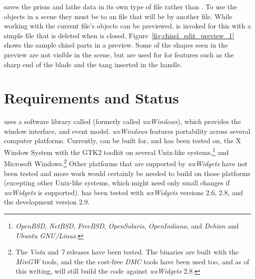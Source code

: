 \IXpkgu{} saves the prism and lathe data in its own type
of file rather than \IXpov{} .
To use the objects in a \IXpov{} scene they
must be  to an  file that will be
 by another  file. While
working with \IXpkg{} the current file's objects can
be previewed. \IXpov{} is invoked for this with a simple
 file that is deleted when \IXpov{} is closed.
Figure~\ref{fig:chisel_edit_preview_1}
shows the sample chisel parts in a \IXpov{} preview. Some
of the shapes seen in the preview are not visible in
the scene, but are used for
 for features
such as the sharp end of the blade and the tang inserted
in the handle.


\section{Requirements and Status}%

\IXpkgu{} uses a software library called 
(formerly called \emph{wxWindows}), which provides the window
interface, and event model. \emph{wxWindows} features
portability across several computer platforms. Currently,
\IXpkg{} can be built for, and has been tested on, the
X Window System with the GTK2 toolkit on several
Unix-like systems,\footnote{
\emph{OpenBSD}, \emph{NetBSD}, \emph{FreeBSD},
\emph{OpenSolaris}, \emph{OpenIndiana}, and
\emph{Debian} and \emph{Ubuntu} \emph{GNU/Linux}.
}
and Microsoft Windows.\footnote{
The \emph{Vista} and \emph{7} releases have been tested.
The binaries are built with the \emph{MinGW} tools, and
the the cost-free \emph{DMC} tools have been used too,
and as of this writing, will still build the code against
\emph{wxWidgets} 2.8.
}
Other platforms that are supported by \emph{wxWidgets} have
not been tested and
more work would certainly be needed to
build \IXpkg{} on those platforms
(excepting other Unix-like systems, which might
need only small changes if \emph{wxWidgets} is supported).
\IXpkgu{} has been
tested with \emph{wxWidgets} versions 2.6, 2.8, and the
development version 2.9.

